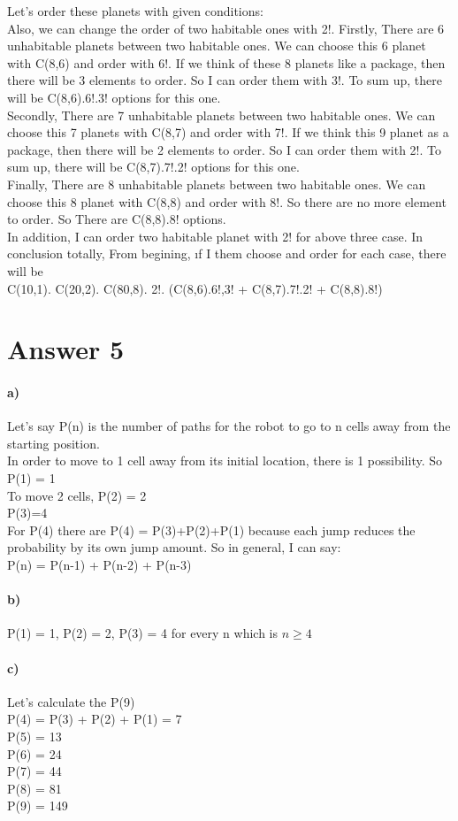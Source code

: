 \documentclass[12pt]{article}
\begin{document}
Let's order these planets with given conditions:\\
Also, we can change the order of two habitable ones with 2!.
Firstly, There are 6 unhabitable planets between two habitable ones. We can choose this 6 planet with C(8,6) and order with 6!. If we think of these 8 planets like a package, then there will be 3 elements to order. So I can order them with 3!. To sum up, there will be C(8,6).6!.3! options for this one.\\

Secondly, There are 7 unhabitable planets between two habitable ones. We can choose this 7 planets with C(8,7) and order with 7!. If we think this 9 planet as a package, then there will be 2 elements to order. So I can order them with 2!. To sum up, there will be C(8,7).7!.2! options for this one. \\

Finally, There are 8 unhabitable planets between two habitable ones. We can choose this 8 planet with C(8,8) and order with 8!. So there are no more element to order. So There are C(8,8).8! options.\\

In addition, I can order two habitable planet with 2! for above three case. In conclusion totally, From begining, ıf I them choose and order for each case, there will be \\
C(10,1). C(20,2). C(80,8). 2!. (C(8,6).6!,3! + C(8,7).7!.2! + C(8,8).8!)\\
\section*{Answer 5}
\paragraph{a)}
Let's say P(n) is the number of paths for the robot to go to n cells away from the starting position.\\

In order to move to 1 cell away from its initial location, there is 1 possibility. So P(1) = 1\\

To move 2 cells, P(2) = 2\\
P(3)=4\\

For P(4) there are P(4) = P(3)+P(2)+P(1) because each jump reduces the probability by its own jump amount. So in general, I can say:\\

P(n) = P(n-1) + P(n-2) + P(n-3)\\

\paragraph{b)}
P(1) = 1, P(2) = 2, P(3) = 4 for every n which is $n\ge4$\\
\paragraph{c)}
Let's calculate the P(9)\\
P(4) = P(3) + P(2) + P(1) = 7\\
P(5) = 13\\
P(6) = 24\\
P(7) = 44\\
P(8) = 81\\
P(9) = 149
\end{document}
